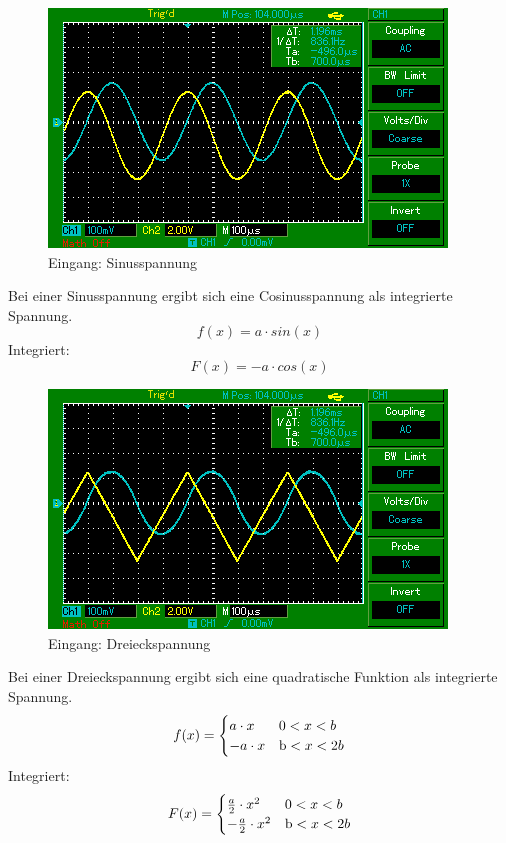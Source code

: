 \begin{figure}[H]
  \centering
  \includegraphics{MAP002.png}
  \caption{Eingang: Sinusspannung }
  \label{fig:Sinusspannung}
\end{figure}

Bei einer Sinusspannung ergibt sich eine Cosinusspannung als integrierte Spannung.
\begin{equation*}
  f(x) = a \cdot sin(x)
\end{equation*}
Integriert:
\begin{equation*}
  F(x) = -a \cdot cos(x)
\end{equation*}

\begin{figure}[H]
  \centering
  \includegraphics{MAP003.png}
  \caption{Eingang: Dreieckspannung}
  \label{fig:Dreieckspannung}
\end{figure}

Bei einer Dreieckspannung ergibt sich eine quadratische Funktion als integrierte Spannung.
\begin{equation*}
  f(x) =
  \begin{cases}
    a \cdot x & \text 0 < x < b \\
    -a \cdot x & \text b < x < 2b \\
  \end{cases}
\end{equation*}
Integriert:
\begin{equation*}
  F(x) =
  \begin{cases}
    \frac{a}{2} \cdot x^2 & \text 0 < x < b \\
    -\frac{a}{2} \cdot x^2 & \text b < x < 2b \\
  \end{cases}
\end{equation*}
